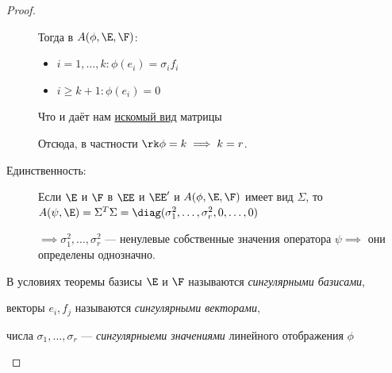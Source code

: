 \begin{proof}
\begin{description}
        Тогда в $A(\phi, \E, \F)$:
        \begin{itemize}
            \item $i = 1, \dots, k \colon \phi(e_i) = \sigma_i f_i$
            \item $i \geq k + 1 \colon \phi(e_i) = 0$
        \end{itemize}

        Что и даёт нам \hyperref[lec31:SVD_matrix]{искомый вид} матрицы

        \bigskip
        Отсюда, в частности $\rk \phi = k \implies k = r$.

        \item[Единственность:] \mbox{}
        \item[] 
            Если $\E$ и $\F$ в $\EE$ и $\EE'$ и $A(\phi, \E, \F)$ имеет вид \hyperref[lec31:SVD_matrix]{$\Sigma$}, то $A(\psi, \E) = \Sigma^{T} \Sigma = \diag(\sigma_1^2, \dots, \sigma_r^2, 0, \dots, 0) $
            
            $\implies \sigma_1^2, \dots, \sigma_r^2$ --- ненулевые собственные значения оператора $\psi \implies$ они определены однозначно.
 
    \end{description}

    \bigskip    
    \begin{definition}
        В условиях теоремы базисы $\E$ и $\F$ называются \textit{сингулярными базисами}, 
        
        векторы $e_i, f_j$ называются \textit{сингулярными векторами}, 
        
        числа $\sigma_1, \dots, \sigma_r$ --- \textit{сингулярныеми значениями} линейного отображения $\phi$
    \end{definition}

\end{proof}
